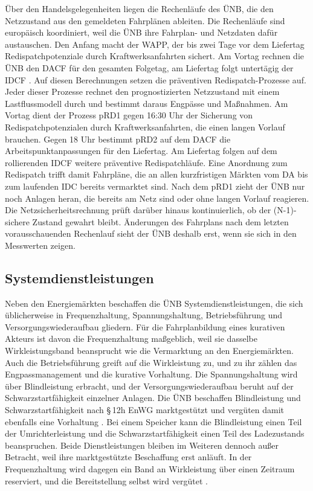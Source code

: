 Über den Handelsgelegenheiten liegen die Rechenläufe des \ac{ÜNB}, die den Netzzustand aus den gemeldeten Fahrplänen ableiten.
Die Rechenläufe sind europäisch koordiniert, weil die \ac{ÜNB} ihre Fahrplan- und Netzdaten dafür austauschen.
Den Anfang macht der \ac{WAPP}, der bis zwei Tage vor dem Liefertag Redispatchpotenziale durch Kraftwerksanfahrten sichert.
Am Vortag rechnen die \ac{ÜNB} den \ac{DACF} für den gesamten Folgetag, am Liefertag folgt untertägig der \ac{IDCF} \cite{leeuwen_integration_2020}.
Auf diesen Berechnungen setzen die präventiven Redispatch-Prozesse auf.
Jeder dieser Prozesse rechnet den prognostizierten Netzzustand mit einem Lastflussmodell durch und bestimmt daraus Engpässe und Maßnahmen.
Am Vortag dient der Prozess pRD1 gegen 16:30 Uhr der Sicherung von Redispatchpotenzialen durch Kraftwerksanfahrten, die einen langen Vorlauf brauchen.
Gegen 18 Uhr bestimmt pRD2 auf dem \ac{DACF} die Arbeitspunktanpassungen für den Liefertag.
Am Liefertag folgen auf dem rollierenden \ac{IDCF} weitere präventive Redispatchläufe.
Eine Anordnung zum Redispatch trifft damit Fahrpläne, die an allen kurzfristigen Märkten vom \ac{DA} bis zum laufenden \ac{IDC} bereits vermarktet sind.
Nach dem pRD1 zieht der \ac{ÜNB} nur noch Anlagen heran, die bereits am Netz sind oder ohne langen Vorlauf reagieren.
Die Netzsicherheitsrechnung prüft darüber hinaus kontinuierlich, ob der \mbox{(N-1)-sichere} Zustand gewahrt bleibt.
Änderungen des Fahrplans nach dem letzten vorausschauenden Rechenlauf sieht der \ac{ÜNB} deshalb erst, wenn sie sich in den Messwerten zeigen.

\subsection{Systemdienstleistungen}
\label{sec:ancillary_services}

Neben den Energiemärkten beschaffen die \ac{ÜNB} Systemdienstleistungen, die sich üblicherweise in Frequenzhaltung, Spannungshaltung, Betriebsführung und Versorgungswiederaufbau gliedern.
Für die Fahrplanbildung eines kurativen Akteurs ist davon die Frequenzhaltung maßgeblich, weil sie dasselbe Wirkleistungsband beansprucht wie die Vermarktung an den Energiemärkten.
Auch die Betriebsführung greift auf die Wirkleistung zu, und zu ihr zählen das Engpassmanagement und die kurative Vorhaltung.
Die Spannungshaltung wird über Blindleistung erbracht, und der Versorgungswiederaufbau beruht auf der Schwarzstartfähigkeit einzelner Anlagen.
Die \ac{ÜNB} beschaffen Blindleistung und Schwarzstartfähigkeit nach §\,12h \ac{EnWG} marktgestützt und vergüten damit ebenfalls eine Vorhaltung \cite{bundesnetzagentur_monitoringbericht_2026}.
Bei einem Speicher kann die Blindleistung einen Teil der Umrichterleistung und die Schwarzstartfähigkeit einen Teil des Ladezustands beanspruchen.
Beide Dienstleistungen bleiben im Weiteren dennoch außer Betracht, weil ihre marktgestützte Beschaffung erst anläuft.
In der Frequenzhaltung wird dagegen ein Band an Wirkleistung über einen Zeitraum reserviert, und die Bereitstellung selbst wird vergütet \cite{ubertragungsnetzbetreiber_deutschland_praqualifikationsverfahren_2024}.

